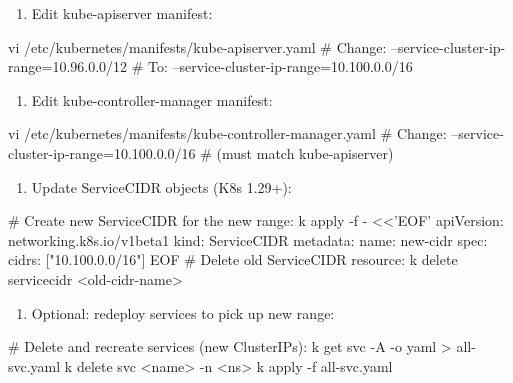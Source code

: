 \begin{tcbitemize}[
  raster columns=3, raster equal height=rows,
  blanker, cheat subtitle
]
\begin{tcbitemize}[
      raster columns=1, raster equal height=rows,
      blanker, cheat subtitle
    ]
      \tcbitem
          {\fontsize{6.5}{7.5}\selectfont\sffamily
          \begin{enumerate}[leftmargin=1.2em, itemsep=0pt, parsep=0pt, topsep=1pt]
            \item Edit kube-apiserver manifest:
          \end{enumerate}}
          \begin{cheatcodebash}
          vi /etc/kubernetes/manifests/kube-apiserver.yaml
          # Change: --service-cluster-ip-range=10.96.0.0/12
          # To:     --service-cluster-ip-range=10.100.0.0/16
          \end{cheatcodebash}
          \vspace{-0.5ex}
          {\fontsize{6.5}{7.5}\selectfont\sffamily
          \begin{enumerate}[leftmargin=1.2em, itemsep=0pt, parsep=0pt, topsep=1pt, start=2]
            \item Edit kube-controller-manager manifest:
          \end{enumerate}}
          \begin{cheatcodebash}
          vi /etc/kubernetes/manifests/kube-controller-manager.yaml
          # Change: --service-cluster-ip-range=10.100.0.0/16
          # (must match kube-apiserver)
          \end{cheatcodebash}
          \vspace{-0.5ex}
          {\fontsize{6.5}{7.5}\selectfont\sffamily
          \begin{enumerate}[leftmargin=1.2em, itemsep=0pt, parsep=0pt, topsep=1pt, start=3]
            \item Update ServiceCIDR objects (K8s 1.29+):
          \end{enumerate}}
          \begin{cheatcodebash}
          # Create new ServiceCIDR for the new range:
          k apply -f - <<'EOF'
          apiVersion: networking.k8s.io/v1beta1
          kind: ServiceCIDR
          metadata: {name: new-cidr}
          spec:
            cidrs: ["10.100.0.0/16"]
          EOF
          # Delete old ServiceCIDR resource:
          k delete servicecidr <old-cidr-name>
          \end{cheatcodebash}
          \vspace{-0.5ex}
          {\fontsize{6.5}{7.5}\selectfont\sffamily
          \begin{enumerate}[leftmargin=1.2em, itemsep=0pt, parsep=0pt, topsep=1pt, start=4]
            \item Optional: redeploy services to pick up new range:
          \end{enumerate}}
          \begin{cheatcodebash}
          # Delete and recreate services (new ClusterIPs):
          k get svc -A -o yaml > all-svc.yaml
          k delete svc <name> -n <ns>
          k apply -f all-svc.yaml
          \end{cheatcodebash}


\end{tcbitemize}
\end{tcbitemize}
